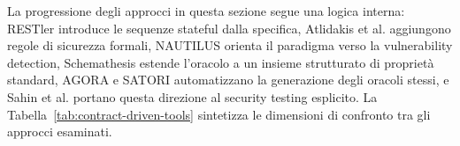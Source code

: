 La progressione degli approcci in questa sezione segue una logica interna: RESTler introduce le sequenze stateful dalla specifica, Atlidakis et al. aggiungono regole di sicurezza formali, NAUTILUS orienta il paradigma verso la vulnerability detection, Schemathesis estende l'oracolo a un insieme strutturato di proprietà standard, AGORA e SATORI automatizzano la generazione degli oracoli stessi, e Sahin et al. portano questa direzione al security testing esplicito. La Tabella~\ref{tab:contract-driven-tools} sintetizza le dimensioni di confronto tra gli approcci esaminati.

